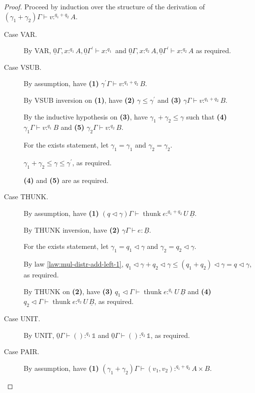 \documentclass[acmsmall,screen,nonacm]{acmart}
\DeclareMathOperator{\thunk}{\text{thunk}}
\newcommand{\unit}{\mathbb{1}}
\newcommand{\tee}{\vdash}
\DeclareMathOperator{\scale}{\mathbin{\triangleleft}}
\begin{document}
\begin{proof}
  Proceed by induction over the structure of the derivation of $(\gamma_1 + \gamma_2)\Gamma \tee v :^{q_1 + q_2} A$.
  \begin{description}
    \item[Case VAR.]
    By VAR, $\underline{0}\Gamma, x :^{q_1} A, \underline{0}\Gamma^\prime \tee x :^{q_1}$ and $\underline{0}\Gamma, x :^{q_2} A, \underline{0}\Gamma^\prime \tee x :^{q_2} A$ as required.
    \\
    \item[Case VSUB.]
    By assumption, have \textbf{(1)} $\gamma^\prime\Gamma \tee v :^{q_1 + q_2} B$.

    By VSUB inversion on \textbf{(1)}, have \textbf{(2)} $\gamma \le \gamma^\prime$ and \textbf{(3)} $\gamma\Gamma \tee v :^{q_1 + q_2} B$.

    By the inductive hypothesis on \textbf{(3)}, have $\gamma_1 + \gamma_2 \le \gamma$ such that \textbf{(4)} $\gamma_1\Gamma \tee v :^{q_1} B$ and \textbf{(5)} $\gamma_2\Gamma \tee v :^{q_2} B$.

    For the exists statement, let $\gamma_1 = \gamma_1$ and $\gamma_2 = \gamma_2$.

    $\gamma_1 + \gamma_2 \le \gamma \le \gamma^\prime$, as required.

    \textbf{(4)} and \textbf{(5)} are as required.
    \\
    \item[Case THUNK.]
    By assumption, have \textbf{(1)} $(q \scale \gamma)\Gamma \tee \thunk e :^{q_1 + q_2} U \, \underline{B}$.

    By THUNK inversion, have \textbf{(2)} $\gamma\Gamma \tee e : \underline{B}$.

    For the exists statement, let $\gamma_1 = q_1 \scale \gamma$ and $\gamma_2 = q_2 \scale \gamma$.

    By law \ref{law:mul-distr-add-left-1}, $q_1 \scale \gamma + q_2 \scale \gamma \le (q_1 + q_2) \scale \gamma = q \scale \gamma$, as required.

    By THUNK on \textbf{(2)}, have \textbf{(3)} $q_1 \scale \Gamma \tee \thunk e :^{q_1} U \, \underline{B}$ and \textbf{(4)} $q_2 \scale \Gamma \tee \thunk e :^{q_2} U \, \underline{B}$, as required.
    \\
    \item[Case UNIT.]
    By UNIT, $\underline{0}\Gamma \tee () :^{q_1} \unit$ and $\underline{0}\Gamma \tee () :^{q_2} \unit$, as required.
    \\
    \item[Case PAIR.]
    By assumption, have \textbf{(1)} $(\gamma_1 + \gamma_2)\Gamma \tee (v_1, v_2) :^{q_1 + q_2} A \times B$.


\end{description}
\end{proof}
\end{document}

